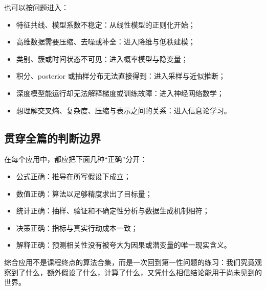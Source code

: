 也可以按问题进入：

\begin{itemize}
\tightlist
\item
  特征共线、模型系数不稳定：从线性模型的正则化开始；
\item
  高维数据需要压缩、去噪或补全：进入降维与低秩建模；
\item
  类别、簇或时间状态不可见：进入概率模型与隐变量；
\item
  积分、posterior 或抽样分布无法直接得到：进入采样与近似推断；
\item
  深度模型能运行却无法解释梯度或训练故障：进入神经网络数学；
\item
  想理解交叉熵、复杂度、压缩与表示之间的关系：进入信息论学习。
\end{itemize}

\subsection{贯穿全篇的判断边界}

在每个应用中，都应把下面几种``正确''分开：

\begin{itemize}
\tightlist
\item
  公式正确：推导在所写假设下成立；
\item
  数值正确：算法以足够精度求出了目标量；
\item
  统计正确：抽样、验证和不确定性分析与数据生成机制相符；
\item
  决策正确：指标与真实行动成本一致；
\item
  解释正确：预测相关性没有被夸大为因果或潜变量的唯一现实含义。
\end{itemize}

综合应用不是课程终点的算法合集，而是一次回到第一性问题的练习：我们究竟观察到了什么，额外假设了什么，计算了什么，又凭什么相信结论能用于尚未见到的世界。

